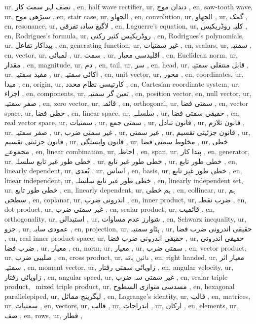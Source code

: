 ur, نصف لہر سمت کار ,
en, half wave rectifier,
ur, دندان موج ,
en, saw-tooth wave,
ur, سیڑھی موج ,
en, stair case,
ur, الجھاو ,
en, convolution,
ur, الجھاو ,
ur, گمک ,
en, resonance,
ur, لاگیغ سادہ تفرقی ,
en, Laguerre's equation,
ur, کلیہ روڈریکیس ,
en, Rodrigues's formula,
ur, روڈریکیس کثیر رکنی ,
en, Rodrigues's polynomials,
ur, پیداکار تفاعل ,
en, generating function,
ur, غیر سمتیات ,
en, scalars,
ur, سمتیہ ,
en, vector,
ur, لمبائی ,
ur, سمت ,
ur, اقلیدسی معیار ,
en, Euclidean norm,
ur, مقدار ,
en, magnitude,
ur, دم ,
en, tail,
ur, سر ,
en, head,
ur, قابل منتقلی سمتیہ ,
ur, مقید سمتیہ ,
ur, اکائی سمتیہ ,
en, unit vector,
ur, محور ,
en, coordinates,
ur, مبدا ,
en, origin,
ur, کارتیسی نظام محدد ,
en, Cartesian coordinate system,
ur, اجزاء ,
en, components,
ur, تعین گر سمتیہ ,
en, position vector,
en, null vector,
ur, صفر سمتیہ ,
en, zero vector,
ur, قائمہ ,
en, orthogonal,
ur, سمتی فضا ,
en, vector space,
ur, خطی فضا ,
en, linear space,
ur, سلسلے ,
ur, حقیقی سمتی فضا ,
en, real vector space,
ur, سمتیات ,
ur, سمتی جمع ,
ur, قانون تبادل ,
ur, قانون تلازم ,
ur, صفر سمتیہ ,
ur, غیر سمتی ضرب ,
ur, غیر سمتی ,
ur, قانون جزئیتی تقسیم ,
ur, قانون جزئیتی تقسیم ,
ur, قانون وابستگی ,
ur, مخلوط سمتی فضا ,
ur, خطی مجموعے ,
en, linear combination,
ur, احاطہ ,
en, span,
ur, پیدا کار ,
en, generator,
ur, خطی طور غیر تابع سلسلہ ,
ur, خطی طور غیر تابع ,
ur, خطی طور تابع ,
en, linearly dependent,
ur,  بُعدی ,
ur, اساس ,
en, basis,
ur, خطی طور غیر تابع ,
en, linear independent,
ur, خطی طور غیر تابع سلسلہ ,
en, linearly independent set,
ur, خطی طور تابع ,
en, linearly dependent,
ur, ہم خطی ,
en, collinear,
ur, ہم سطحی ,
en, coplanar,
ur, اندرونی ضرب ,
en, inner product,
ur, ضرب نقطہ ,
en, dot product,
ur, غیر سمتی ضرب ,
en, scalar product,
ur, قائمیت ,
en, orthogonality,
ur, استبدالی ,
ur, شوارز عدم مساوات ,
en, Schwarz inequality,
ur, جزو ,
ur, عمودی سایہ ,
en, projection,
ur, ہٹاو سمتیہ ,
ur, حقیقی اندرونی ضرب فضا ,
en, real inner product space,
ur, حقیقی اندرونی ضرب فضا ,
ur, حقیقی اندرونی ضرب فضا ,
ur, معیار ,
en, norm,
ur, معیار ,
ur, سمتی ضرب ,
en, vector product,
ur, صلیبی ضرب ,
en, cross product,
ur, دائیں ہاتھ ,
en, right handed,
ur, معیار اثر سمتیہ ,
en, moment vector,
ur, زاویائی سمتی رفتار ,
en, angular velocity,
ur, زاویائی رفتار ,
en, angular speed,
ur, غیر سمتی سہ ضرب ,
en, scalar triple product, \, mixed triple product,
ur, مسدسی متوازی السطوح ,
en, hexagonal parallelepiped,
ur, لیگرینج مماثل ,
en, Lagrange's identity,
ur, قالب ,
en, matrices,
ur, سمتیات ,
en, vectors,
ur, قالب ,
ur, اندراجات ,
ur, ارکان ,
en, elements,
ur, صف ,
en, rows,
ur, قطار ,
